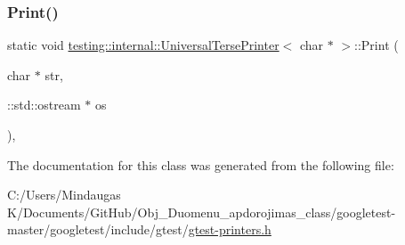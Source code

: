 \subsubsection{\texorpdfstring{Print()}{Print()}\hspace{0.1cm}{\footnotesize\ttfamily [3/3]}}
{\footnotesize\ttfamily static void \mbox{\hyperlink{classtesting_1_1internal_1_1_universal_terse_printer}{testing\+::internal\+::\+Universal\+Terse\+Printer}}$<$ char $\ast$ $>$\+::Print (\begin{DoxyParamCaption}\item[{char $\ast$}]{str,  }\item[{\+::std\+::ostream $\ast$}]{os }\end{DoxyParamCaption})\hspace{0.3cm}{\ttfamily [inline]}, {\ttfamily [static]}}



The documentation for this class was generated from the following file\+:\begin{DoxyCompactItemize}
\item 
C\+:/\+Users/\+Mindaugas K/\+Documents/\+Git\+Hub/\+Obj\+\_\+\+Duomenu\+\_\+apdorojimas\+\_\+class/googletest-\/master/googletest/include/gtest/\mbox{\hyperlink{googletest-master_2googletest_2include_2gtest_2gtest-printers_8h}{gtest-\/printers.\+h}}\end{DoxyCompactItemize}

